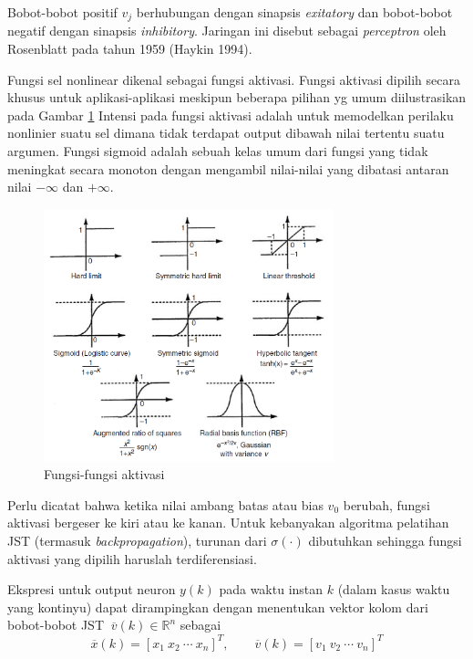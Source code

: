 Bobot-bobot positif  $v_j$ berhubungan dengan sinapsis \textit{exitatory} dan bobot-bobot negatif dengan sinapsis \textit{inhibitory}. Jaringan ini disebut sebagai \textit{perceptron} oleh Rosenblatt pada tahun 1959 (Haykin 1994).

Fungsi sel nonlinear dikenal sebagai fungsi aktivasi. Fungsi aktivasi dipilih secara khusus untuk aplikasi-aplikasi meskipun beberapa pilihan yg umum diilustrasikan pada Gambar \ref{fig:3:activation} Intensi pada fungsi aktivasi adalah untuk memodelkan perilaku nonlinier suatu sel dimana tidak terdapat output dibawah nilai tertentu suatu argumen. Fungsi sigmoid adalah sebuah kelas umum dari fungsi yang tidak meningkat secara monoton dengan mengambil nilai-nilai yang dibatasi antaran nilai $-\infty$ dan $+\infty$. 
\begin{figure}[!h]
	\centering
	\includegraphics[width=0.75\textwidth]{figures/activationFunction}
	\caption{Fungsi-fungsi aktivasi}
	\label{fig:3:activation}
\end{figure}
Perlu dicatat bahwa ketika nilai ambang batas atau bias $v_0$ berubah, fungsi aktivasi bergeser ke kiri atau ke kanan. Untuk kebanyakan algoritma pelatihan JST (termasuk \textit{backpropagation}), turunan dari $\sigma(\cdot)$ dibutuhkan sehingga fungsi aktivasi yang dipilih haruslah terdiferensiasi.

Ekspresi untuk output neuron $y(k)$ pada waktu instan $k$ (dalam kasus waktu yang kontinyu) dapat dirampingkan dengan menentukan vektor kolom dari bobot-bobot JST $\ \overline{v}(k) \in \mathbb{R}^n $ sebagai
\vspace{-1em}
\begin{equation} \label{eq:3:vektorKolom}
\overline{x}(k) = [x_1\ x_2\ \cdots\ x_n]^T, \qquad \overline{v}(k) = [v_1\ v_2\ \cdots\ v_n]^T
\end{equation}


